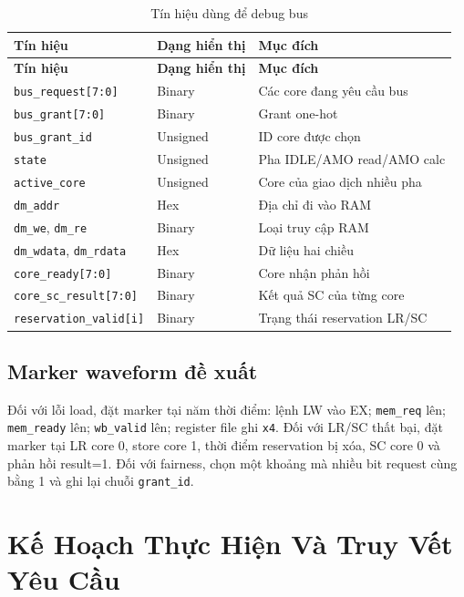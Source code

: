 \begin{longtable}{p{} p{} p{}}
\caption{Tín hiệu dùng để debug bus}\label{tab:bus_debug_signals}\\
\toprule
\textbf{Tín hiệu} & \textbf{Dạng hiển thị} & \textbf{Mục đích} \\
\midrule
\endfirsthead
\toprule
\textbf{Tín hiệu} & \textbf{Dạng hiển thị} & \textbf{Mục đích} \\
\midrule
\endhead
\texttt{bus\_request[7:0]} & Binary & Các core đang yêu cầu bus \\
\texttt{bus\_grant[7:0]} & Binary & Grant one-hot \\
\texttt{bus\_grant\_id} & Unsigned & ID core được chọn \\
\texttt{state} & Unsigned & Pha IDLE/AMO read/AMO calc \\
\texttt{active\_core} & Unsigned & Core của giao dịch nhiều pha \\
\texttt{dm\_addr} & Hex & Địa chỉ đi vào RAM \\
\texttt{dm\_we}, \texttt{dm\_re} & Binary & Loại truy cập RAM \\
\texttt{dm\_wdata}, \texttt{dm\_rdata} & Hex & Dữ liệu hai chiều \\
\texttt{core\_ready[7:0]} & Binary & Core nhận phản hồi \\
\texttt{core\_sc\_result[7:0]} & Binary & Kết quả SC của từng core \\
\texttt{reservation\_valid[i]} & Binary & Trạng thái reservation LR/SC \\
\bottomrule
\end{longtable}

\section{Marker waveform đề xuất}

Đối với lỗi load, đặt marker tại năm thời điểm: lệnh LW vào EX; \texttt{mem\_req} lên; \texttt{mem\_ready} lên; \texttt{wb\_valid} lên; register file ghi \texttt{x4}. Đối với LR/SC thất bại, đặt marker tại LR core 0, store core 1, thời điểm reservation bị xóa, SC core 0 và phản hồi result=1. Đối với fairness, chọn một khoảng mà nhiều bit request cùng bằng 1 và ghi lại chuỗi \texttt{grant\_id}.

\chapter{Kế Hoạch Thực Hiện Và Truy Vết Yêu Cầu}
\label{app:plan}

